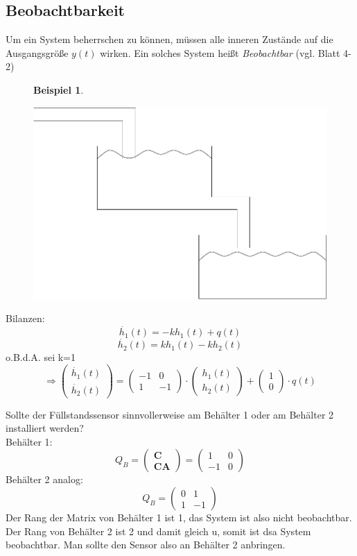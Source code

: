 \documentclass[12pt,a4paper,ngerman]{scrartcl}
\newtheorem{bsp}{Beispiel}[section] %
\begin{document}
\subsection{Beobachtbarkeit}

Um ein System beherrschen zu können, müssen alle inneren Zustände auf die Ausgangsgröße $y(t)$ wirken. Ein solches System heißt \emph{Beobachtbar} (vgl. Blatt 4-2)
\begin{figure}[H]
\begin{bsp}
\end{bsp}
\centering
\includegraphics[width=.4\linewidth]{sysregel_bsp_4_2}
\end{figure}
Bilanzen:
\[
\dot{h_1}(t)=-kh_1(t)+q(t)
\]
\[
\dot{h_2}(t)=kh_1(t)-kh_2(t)
\]
o.B.d.A. sei k=1
\[
\Rightarrow
\begin{pmatrix}
  \dot{h_1}(t)\\
\dot{h_2}(t)
\end{pmatrix}
=
\begin{pmatrix}
  -1&0\\
1&-1
\end{pmatrix}
\cdot
\begin{pmatrix}
  h_1(t)\\
h_2(t)
\end{pmatrix}
+
\begin{pmatrix}
  1\\0
\end{pmatrix}
\cdot q(t)
\]

Sollte der Füllstandssensor sinnvollerweise am Behälter 1 oder am Behälter 2 installiert werden?\\
Behälter 1:
\[
Q_B=
\begin{pmatrix}
  \mathbf{C}\\
\mathbf{CA}
\end{pmatrix}
=
\begin{pmatrix}
  1&0\\
-1&0
\end{pmatrix}
\]
Behälter 2 analog:
\[
Q_B=
\begin{pmatrix}
  0&1\\
1&-1
\end{pmatrix}
\]
Der Rang der Matrix von Behälter 1 ist 1, das System ist also nicht beobachtbar. Der Rang von Behälter 2 ist 2 und damit gleich u, somit ist dsa System beobachtbar. Man sollte den Sensor also an Behälter 2 anbringen.
\end{document}
